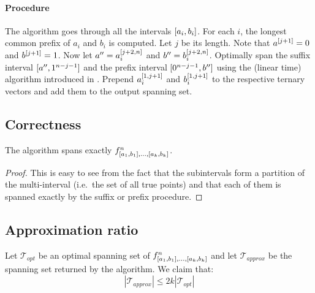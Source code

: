 \documentclass{article}
\begin{document}
\paragraph{Procedure}
The algorithm goes through
all the intervals $[a_i, b_i]$.
For each $i$, the longest common prefix of $a_i$ and $b_i$
is computed. Let $j$ be its length.
Note that $a^{[j+1]} = 0$ and $b^{[j+1]} = 1$.
Now let $a'' = a_i^{[j+2, n]}$
and $b'' = b_i^{[j+2, n]}$.
Optimally span the suffix interval
$[a'', 1^{n-j-1}]$
and the prefix interval
$[0^{n-j-1}, b'']$
using the (linear time) algorithm
introduced in \cite{Schieber2005154}.
Prepend $a_i^{[1, j+1]}$
and $b_i^{[1, j+1]}$
to the respective ternary vectors
and add them to the output spanning set.


\subsection{Correctness}
\begin{theorem}
The algorithm spans exactly
$f^n_{[a_1, b_1], \ldots, [a_k, b_k]}$.
\end{theorem}

\begin{proof}
This is easy to see from the fact that the subintervals
form a partition of the multi-interval
(i.e.~the set of all true points)
and that each of them is spanned exactly
by the suffix or prefix procedure.
\end{proof}

\subsection{Approximation ratio}
\begin{theorem}
Let $\mathcal{T}_{opt}$ be an optimal spanning set of
$f^n_{[a_1, b_1], \ldots, [a_k, b_k]}$
and let $\mathcal{T}_{approx}$ be the spanning set returned
by the algorithm.
We claim that:
\begin{equation}
|\mathcal{T}_{approx}| \leq 2k |\mathcal{T}_{opt}|
\end{equation}
\end{theorem}
\end{document}
